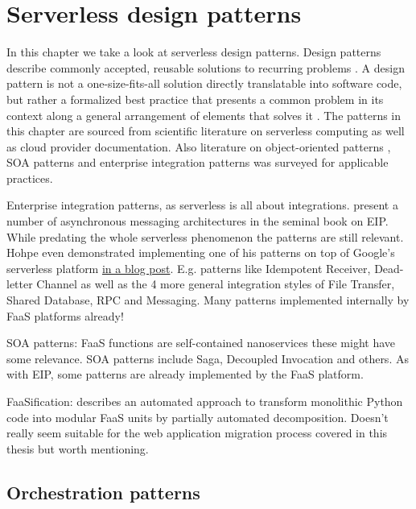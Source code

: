 \chapter{Serverless design patterns} \label{cha:patterns}

In this chapter we take a look at serverless design patterns. Design patterns describe commonly accepted, reusable solutions to recurring problems \parencite{hohpe2004enterprise}. A design pattern is not a one-size-fits-all solution directly translatable into software code, but rather a formalized best practice that presents a common problem in its context along a general arrangement of elements that solves it \parencite{gamma94designPatterns}. The patterns in this chapter are sourced from scientific literature on serverless computing as well as cloud provider documentation. Also literature on object-oriented patterns \parencite{gamma94designPatterns}, SOA patterns \parencite{rotem12soa} and enterprise integration patterns \parencite{hohpe2004enterprise} was surveyed for applicable practices.

Enterprise integration patterns, as serverless is all about integrations. \textcite{hohpe2004enterprise} present a number of asynchronous messaging architectures in the seminal book on EIP. While predating the whole serverless phenomenon the patterns are still relevant. Hohpe even demonstrated implementing one of his patterns on top of Google's serverless platform \href{http://www.enterpriseintegrationpatterns.com/ramblings/google_cloud_functions.html}{in a blog post}. E.g. patterns like Idempotent Receiver, Dead-letter Channel as well as the 4 more general integration styles of File Transfer, Shared Database, RPC and Messaging. Many patterns implemented internally by FaaS platforms already!

SOA patterns: FaaS functions are self-contained nanoservices these might have some relevance. SOA patterns \parencite{rotem12soa} include Saga, Decoupled Invocation and others. As with EIP, some patterns are already implemented by the FaaS platform.

FaaSification: \textcite{spillner17transformpython} describes an automated approach to transform monolithic Python code into modular FaaS units by partially automated decomposition. Doesn't really seem suitable for the web application migration process covered in this thesis but worth mentioning.

\section{Orchestration patterns} \label{sec:orchestrationPatterns}

